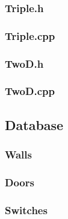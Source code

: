 \documentclass{article}
\begin{document}
\subsubsection{Triple.h}
	
	 				
\subsubsection{Triple.cpp}
	
	 				
\subsubsection{TwoD.h}
	

\subsubsection{TwoD.cpp}	
	

\subsection{Database} \label{subsec:database}
	
\subsubsection{Walls}

\tiny{}

\setlength{\tabcolsep}{2.5pt}

\small{}
\subsubsection{Doors}

\subsubsection{Switches}
\end{document}
